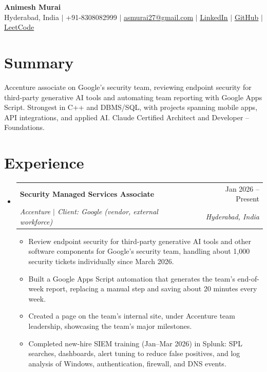 \documentclass[a4paper,11pt]{article}
\makeatletter
\newcommand{\resumeItem}[1]{\item\small{#1\vspace{-1pt}}}
\newcommand{\resumeSubheading}[4]{
  \vspace{-1pt}\item
    \begin{tabularx}{0.97\textwidth}[t]{@{}>{\raggedright\arraybackslash}X@{\hspace{0.75em}}r@{}}
      \textbf{#1} & #2 \\
      \textit{\small#3} & \textit{\small #4} \\
    \end{tabularx}\vspace{-3pt}
}
\newcommand{\resumeSubItemListStart}{\begin{itemize}[leftmargin=0.15in, label={}]}
\newcommand{\resumeSubItemListEnd}{\end{itemize}}
\newcommand{\resumeItemListStart}{\begin{itemize}[itemsep=2pt]}
\newcommand{\resumeItemListEnd}{\end{itemize}\vspace{-2pt}}
\makeatother
\begin{document}
\begin{center}
    {\Huge\bfseries Animesh Murai} \\ \vspace{4pt}
    \small Hyderabad, India $|$ +91-8308082999 $|$
    \href{mailto:asmurai27@gmail.com}{\underline{asmurai27@gmail.com}} $|$
    \href{https://www.linkedin.com/in/animesh-murai-538384253/}{\underline{LinkedIn}} $|$
    \href{https://github.com/muraias7781}{\underline{GitHub}} $|$
    \href{https://leetcode.com/u/sAMurai7781/}{\underline{LeetCode}}
\end{center}

\section{Summary}
  \small{Accenture associate on Google's security team, reviewing endpoint security for third-party generative AI tools and automating team reporting with Google Apps Script. Strongest in C++ and DBMS/SQL, with projects spanning mobile apps, API integrations, and applied AI. Claude Certified Architect and Developer -- Foundations.}

\section{Experience}
  \resumeSubItemListStart

    \resumeSubheading
      {Security Managed Services Associate}{Jan 2026 -- Present}
      {Accenture $|$ Client: Google (vendor, external workforce)}{Hyderabad, India}
      \resumeItemListStart
        \resumeItem{Review endpoint security for third-party generative AI tools and other software components for Google's security team, handling about 1,000 security tickets individually since March 2026.}
        \resumeItem{Built a Google Apps Script automation that generates the team's end-of-week report, replacing a manual step and saving about 20 minutes every week.}
        \resumeItem{Created a page on the team's internal site, under Accenture team leadership, showcasing the team's major milestones.}
        \resumeItem{Completed new-hire SIEM training (Jan--Mar 2026) in Splunk: SPL searches, dashboards, alert tuning to reduce false positives, and log analysis of Windows, authentication, firewall, and DNS events.}
      \resumeItemListEnd

  \resumeSubItemListEnd

\end{document}
